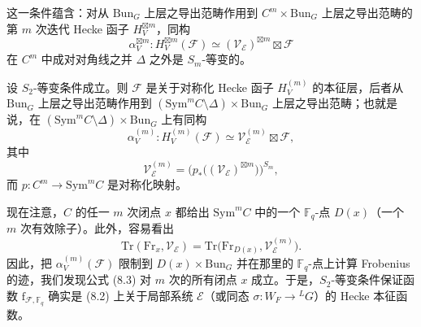\documentclass[11pt,a4paper]{article}
\newcommand{\Bun}{\mathrm{Bun}}
\begin{document}
这一条件蕴含：对从 $\Bun_G$ 上层之导出范畴作用到 $C^m\times \Bun_G$ 上层之导出范畴的第 $m$ 次迭代 Hecke 函子 $H_V^{\boxtimes m}$，同构
\[
\alpha_V^{\boxtimes m} : H_V^{\boxtimes m}(\mathcal{F}) \simeq (\mathcal{V}_{\mathcal{E}})^{\boxtimes m}\boxtimes \mathcal{F}
\]
在 $C^m$ 中成对对角线之并 $\Delta$ 之外是 $S_m$-等变的。


设 $S_2$-等变条件成立。则 $\mathcal{F}$ 是关于对称化 Hecke 函子 $H_V^{(m)}$ 的本征层，后者从 $\Bun_G$ 上层之导出范畴作用到 $(\mathrm{Sym}^m C\setminus\Delta)\times \Bun_G$ 上层之导出范畴；也就是说，在 $(\mathrm{Sym}^m C\setminus\Delta)\times \Bun_G$ 上有同构
\[
\alpha_V^{(m)} : H_V^{(m)}(\mathcal{F}) \simeq \mathcal{V}_{\mathcal{E}}^{(m)}\boxtimes \mathcal{F},
\]
其中
\begin{equation}\tag{8.4}
\mathcal{V}_{\mathcal{E}}^{(m)} = \bigl(p_*\bigl((\mathcal{V}_{\mathcal{E}})^{\boxtimes m}\bigr)\bigr)^{S_m},
\end{equation}
而 $p : C^m \to \mathrm{Sym}^m C$ 是对称化映射。

现在注意，$C$ 的任一 $m$ 次闭点 $x$ 都给出 $\mathrm{Sym}^m C$ 中的一个 $\mathbb{F}_q$-点 $D(x)$（一个 $m$ 次有效除子）。此外，容易看出
\[
\mathrm{Tr}(\mathrm{Fr}_x, \mathcal{V}_{\mathcal{E}}) = \mathrm{Tr}\bigl(\mathrm{Fr}_{D(x)}, \mathcal{V}_{\mathcal{E}}^{(m)}\bigr).
\]
因此，把 $\alpha_V^{(m)}(\mathcal{F})$ 限制到 $D(x)\times \Bun_G$ 并在那里的 $\mathbb{F}_q$-点上计算 Frobenius 的迹，我们发现公式 (8.3) 对 $m$ 次的所有闭点 $x$ 成立。于是，$S_2$-等变条件保证函数 $\mathrm{f}_{\mathcal{F},\mathbb{F}_q}$ 确实是 (8.2) 上关于局部系统 $\mathcal{E}$（或同态 $\sigma : W_F \to {}^{L}G$）的 Hecke 本征函数。

\end{document}
